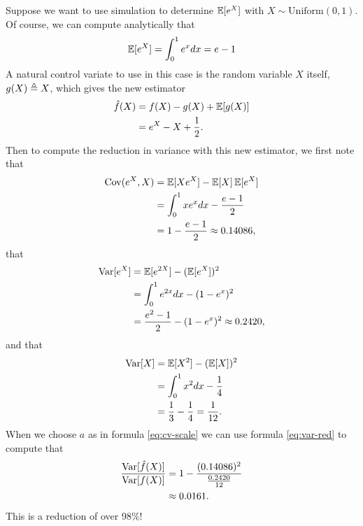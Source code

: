    \begin{example}{\citep{ross2006simulation}}
      Suppose we want to use simulation to determine $\operatorname{\mathbb{E}} [ e^X ]$ with $X \sim \text{Uniform}(0,1)$. Of course, we can compute analytically that
      \begin{equation*}
          \operatorname{\mathbb{E}} [ e^X ] = \int_0^1 e^x dx = e - 1
      \end{equation*}
      A natural control variate to use in this case is the random variable $X$ itself, $g(X) \triangleq X$, which gives the new estimator
      \begin{align*}
        \hat{f}(X)
          &= f(X) - g(X) + \operatorname{\mathbb{E}} [ g(X) ]  \\
          &= e^X - X + \frac{1}{2}.
      \end{align*}
      Then to compute the reduction in variance with this new estimator, we first note that
      \begin{align*}
        \operatorname{Cov}(e^X, X)
          &= \operatorname{\mathbb{E}} [ Xe^X ] - \operatorname{\mathbb{E}} [ X ]\operatorname{\mathbb{E}} [ e^X ] \\
          &= \int_0^1 xe^x dx - \frac{e-1}{2} \\
          &= 1 - \frac{e-1}{2} \approx 0.14086,
      \end{align*}
      that
      \begin{align*}
        \operatorname{Var} [ e^X ]
          &= \operatorname{\mathbb{E}} [ e^{2X} ] - (\operatorname{\mathbb{E}} [ e^X ])^2 \\
          &= \int_0^1 e^{2x} dx - (1 - e^x)^2 \\
          &= \frac{e^2 - 1}{2}  - (1 - e^x)^2 \approx 0.2420,
      \end{align*}
      and that
      \begin{align*}
        \operatorname{Var} [ X ] &= \operatorname{\mathbb{E}} [ X^2 ] - (\operatorname{\mathbb{E}} [ X ])^2 \\
          &= \int_0^1 x^2 dx - \frac{1}{4} \\
          &= \frac{1}{3} - \frac{1}{4} = \frac{1}{12}.
      \end{align*}
      When we choose $a$ as in formula \ref{eq:cv-scale} we can use formula \ref{eq:var-red} to compute that
      \begin{align*}
        \frac{ \operatorname{Var} [ \hat{f}(X) ] }{ \operatorname{Var} [ f(X) ]}
          &= 1 - \frac{(0.14086)^2}{\frac{0.2420}{12}} \\
          &\approx 0.0161.
      \end{align*}
      This is a reduction of over 98\%!


\end{example}
